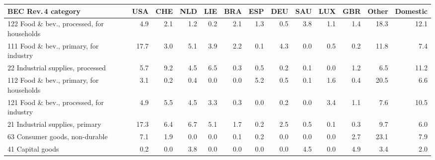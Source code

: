 \begin{tabular}{lrrrrrrrrrrrr}
\toprule
BEC Rev.\,4 category & USA & CHE & NLD & LIE & BRA & ESP & DEU & SAU & LUX & GBR & Other & Domestic \\
\midrule
122 Food \& bev., processed, for households & 4.9 & 2.1 & 1.2 & 0.2 & 2.1 & 1.3 & 0.5 & 3.8 & 1.1 & 1.4 & 18.3 & 12.1 \\
111 Food \& bev., primary, for industry & 17.7 & 3.0 & 5.1 & 3.9 & 2.2 & 0.1 & 4.3 & 0.0 & 0.5 & 0.2 & 11.8 & 7.4 \\
22 Industrial supplies, processed & 5.7 & 9.2 & 4.5 & 6.5 & 0.3 & 0.5 & 0.2 & 0.1 & 0.0 & 1.2 & 6.5 & 11.2 \\
112 Food \& bev., primary, for households & 3.1 & 0.2 & 0.4 & 0.0 & 0.0 & 5.2 & 0.5 & 0.1 & 1.6 & 0.4 & 20.5 & 6.6 \\
121 Food \& bev., processed, for industry & 4.9 & 5.5 & 4.5 & 3.3 & 0.3 & 0.0 & 0.2 & 0.0 & 3.4 & 1.1 & 7.6 & 10.5 \\
21 Industrial supplies, primary & 17.3 & 6.4 & 6.7 & 5.1 & 1.7 & 0.2 & 2.5 & 0.5 & 0.1 & 0.3 & 9.7 & 6.0 \\
63 Consumer goods, non-durable & 7.1 & 1.9 & 0.0 & 0.0 & 0.1 & 0.2 & 0.0 & 0.0 & 0.0 & 2.7 & 23.1 & 7.9 \\
41 Capital goods & 0.2 & 0.0 & 3.8 & 0.0 & 0.0 & 0.0 & 0.0 & 4.5 & 0.0 & 4.9 & 3.4 & 2.0 \\
\bottomrule
\end{tabular}
